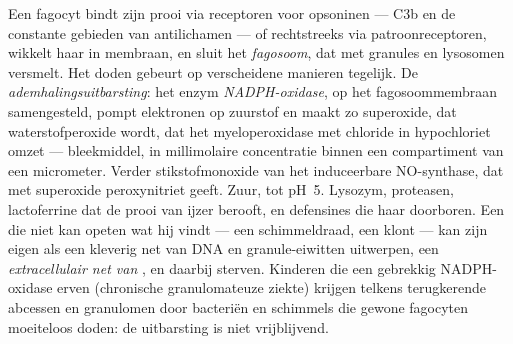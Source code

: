 \begin{definition}\label{def:b3:innate-immunity:killing}
Een fagocyt bindt zijn prooi via receptoren voor opsoninen --- C3b en
de constante gebieden van antilichamen --- of rechtstreeks via
patroonreceptoren, wikkelt haar in membraan, en sluit het
\emph{fagosoom}, dat met granules en lysosomen versmelt. Het doden
gebeurt op verscheidene manieren tegelijk. De
\emph{ademhalingsuitbarsting}: het enzym \emph{NADPH-oxidase}, op het
fagosoommembraan samengesteld, pompt elektronen op zuurstof en maakt zo
superoxide, dat waterstofperoxide wordt, dat het myeloperoxidase met
chloride in hypochloriet omzet --- bleekmiddel, in millimolaire
concentratie binnen een compartiment van een micrometer. Verder
stikstofmonoxide van het induceerbare NO-synthase, dat met superoxide
peroxynitriet geeft. Zuur, tot pH~5. Lysozym, proteasen, lactoferrine
dat de prooi van ijzer berooft, en defensines die haar doorboren. Een
 die niet kan opeten wat hij vindt --- een schimmeldraad, een
klont --- kan zijn eigen  als een kleverig net van DNA en
granule-eiwitten uitwerpen, een \emph{extracellulair net van
}, en daarbij sterven. Kinderen die een gebrekkig
NADPH-oxidase erven (chronische granulomateuze ziekte) krijgen telkens
terugkerende abcessen en granulomen door bacteriën en schimmels die
gewone fagocyten moeiteloos doden: de uitbarsting is niet
vrijblijvend.
\end{definition}


